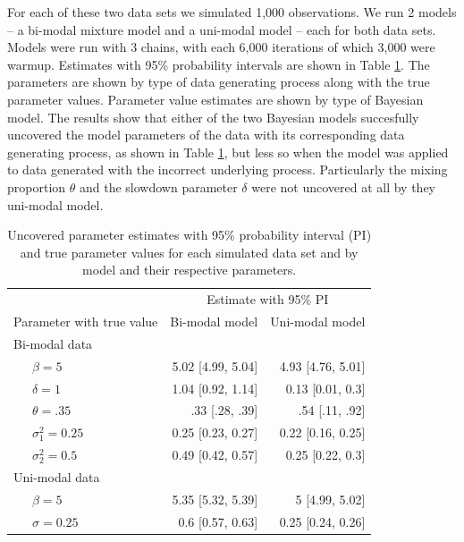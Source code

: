 \documentclass[
  english,
  man,floatsintext]{apa7}
\begin{document}
\begin{appendix}
For each of these two data sets we simulated 1,000 observations. We run
2 models -- a bi-modal mixture model and a uni-modal model -- each for
both data sets. Models were run with 3 chains, with each 6,000
iterations of which 3,000 were warmup. Estimates with 95\% probability
intervals are shown in Table \ref{tab:simparam}. The parameters are
shown by type of data generating process along with the true parameter
values. Parameter value estimates are shown by type of Bayesian model.
The results show that either of the two Bayesian models succesfully
uncovered the model parameters of the data with its corresponding data
generating process, as shown in Table \ref{tab:simparam}, but less so
when the model was applied to data generated with the incorrect
underlying process. Particularly the mixing proportion \(\theta\) and
the slowdown parameter \(\delta\) were not uncovered at all by they
uni-modal model.

\begin{table}[tbp]

\begin{center}
\begin{threeparttable}

\caption{\label{tab:simparam}Uncovered parameter estimates with 95\% probability interval (PI) and true parameter values for each simulated data set and by model and their respective parameters.}

\begin{tabular}{lrr}
\toprule
 & \multicolumn{2}{c}{Estimate with 95\% PI} \\
\cmidrule(r){2-3}
Parameter with true value & \multicolumn{1}{c}{Bi-modal model} & \multicolumn{1}{c}{Uni-modal model}\\
\midrule
Bi-modal data &  & \\
\ \ \ $\beta = 5$ & 5.02 [4.99, 5.04] & 4.93 [4.76, 5.01]\\
\ \ \ $\delta = 1$ & 1.04 [0.92, 1.14] & 0.13 [0.01, 0.3]\\
\ \ \ $\theta = .35$ & .33 [.28, .39] & .54 [.11, .92]\\
\ \ \ $\sigma^2_1 = 0.25$ & 0.25 [0.23, 0.27] & 0.22 [0.16, 0.25]\\
\ \ \ $\sigma^2_2 = 0.5$ & 0.49 [0.42, 0.57] & 0.25 [0.22, 0.3]\\
Uni-modal data &  & \\
\ \ \ $\beta = 5$ & 5.35 [5.32, 5.39] & 5 [4.99, 5.02]\\
\ \ \ $\sigma = 0.25$ & 0.6 [0.57, 0.63] & 0.25 [0.24, 0.26]\\
\bottomrule
\end{tabular}


\end{threeparttable}
\end{center}
\end{table}
\end{appendix}
\end{document}
